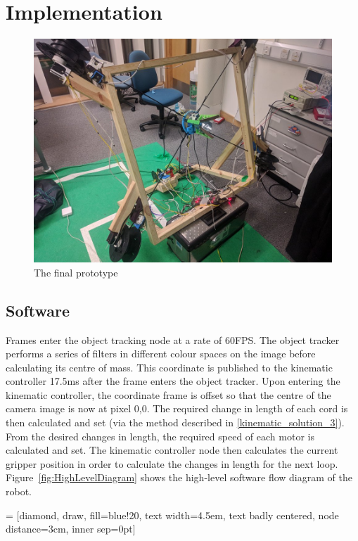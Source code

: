 \documentclass[conference]{IEEEtran}
\begin{document}
\section{Implementation}
\begin{figure}\label{fullPicture}
	\centering
	
	\includegraphics[scale=0.20]{finished_robot.jpg}
	\caption{The final prototype}
\end{figure}
\subsection{Software}
Frames enter the object tracking node at a rate of 60FPS. The object tracker performs a series of filters in different colour spaces on the image before calculating its centre of mass. This coordinate is published to the kinematic controller 17.5ms after the frame enters the object tracker. Upon entering the kinematic controller, the coordinate frame is offset so that the centre of the camera image is now at pixel 0,0. The required change in length of each cord is then calculated and set (via the method described in \ref{kinematic_solution_3}). From the desired changes in length, the required speed of each motor is calculated and set. The kinematic controller node then calculates the current gripper position in order to calculate the changes in length for the next loop.
Figure~\ref{fig:HighLevelDiagram} shows the high-level software flow diagram of the robot.



 = [diamond, draw, fill=blue!20, 
text width=4.5em, text badly centered, node distance=3cm, inner sep=0pt]
\end{document}
